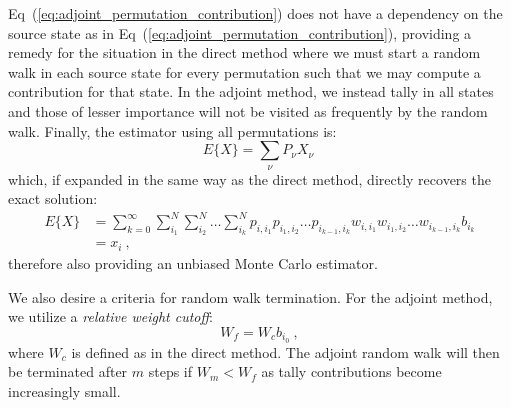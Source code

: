 Eq~(\ref{eq:adjoint_permutation_contribution}) does not have a
dependency on the source state as in
Eq~(\ref{eq:adjoint_permutation_contribution}), providing a remedy for
the situation in the direct method where we must start a random walk
in each source state for every permutation such that we may compute a
contribution for that state. In the adjoint method, we instead tally
in all states and those of lesser importance will not be visited as
frequently by the random walk. Finally, the estimator using all
permutations is:
\begin{equation}
  E\{X\} = \sum_{\nu} P_{\nu} X_{\nu}\:
  \label{eq:adjoint_expectation_value}
\end{equation}
which, if expanded in the same way as the direct method, directly
recovers the exact solution:
\begin{equation}
  \begin{split}
    E\{X\} &=\sum_{k=0}^{\infty}\sum_{i_1}^{N}\sum_{i_2}^{N}\ldots
    \sum_{i_k}^{N} p_{i,i_1}p_{i_1,i_2}\ldots p_{i_{k-1},i_k}
    w_{i,i_1}w_{i_1,i_2}\ldots w_{i_{k-1},i_k} b_{i_k} \\ &= x_i\:,
  \end{split}
  \label{eq:adjoint_expectation_expansion}
\end{equation}
therefore also providing an unbiased Monte Carlo estimator.

We also desire a criteria for random walk termination. For the adjoint
method, we utilize a \textit{relative weight cutoff}:
\begin{equation}
  W_f = W_c b_{i_0}\:,
  \label{eq:relative_weight_cutoff}
\end{equation}
where $W_c$ is defined as in the direct method. The adjoint random
walk will then be terminated after $m$ steps if $W_m < W_f$ as tally
contributions become increasingly small.

